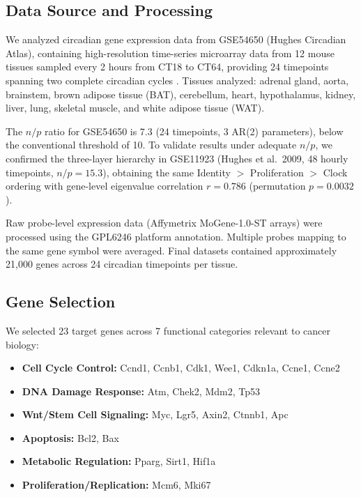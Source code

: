 \documentclass[11pt,letterpaper]{article}
\begin{document}
\subsection{Data Source and Processing}

We analyzed circadian gene expression data from GSE54650 (Hughes Circadian Atlas), containing high-resolution time-series microarray data from 12 mouse tissues sampled every 2 hours from CT18 to CT64, providing 24 timepoints spanning two complete circadian cycles \citep{zhang2014}. Tissues analyzed: adrenal gland, aorta, brainstem, brown adipose tissue (BAT), cerebellum, heart, hypothalamus, kidney, liver, lung, skeletal muscle, and white adipose tissue (WAT).

The $n/p$ ratio for GSE54650 is 7.3 (24 timepoints, 3 AR(2) parameters), below the conventional threshold of 10. To validate results under adequate $n/p$, we confirmed the three-layer hierarchy in GSE11923 (Hughes et al.\ 2009, 48 hourly timepoints, $n/p = 15.3$), obtaining the same Identity $>$ Proliferation $>$ Clock ordering with gene-level eigenvalue correlation $r = 0.786$ (permutation $p = 0.0032$).

Raw probe-level expression data (Affymetrix MoGene-1.0-ST arrays) were processed using the GPL6246 platform annotation. Multiple probes mapping to the same gene symbol were averaged. Final datasets contained approximately 21,000 genes across 24 circadian timepoints per tissue.

\subsection{Gene Selection}

We selected 23 target genes across 7 functional categories relevant to cancer biology:

\begin{itemize}[noitemsep]
    \item \textbf{Cell Cycle Control:} Ccnd1, Ccnb1, Cdk1, Wee1, Cdkn1a, Ccne1, Ccne2
    \item \textbf{DNA Damage Response:} Atm, Chek2, Mdm2, Tp53
    \item \textbf{Wnt/Stem Cell Signaling:} Myc, Lgr5, Axin2, Ctnnb1, Apc
    \item \textbf{Apoptosis:} Bcl2, Bax
    \item \textbf{Metabolic Regulation:} Pparg, Sirt1, Hif1a
    \item \textbf{Proliferation/Replication:} Mcm6, Mki67
\end{itemize}
\end{document}
